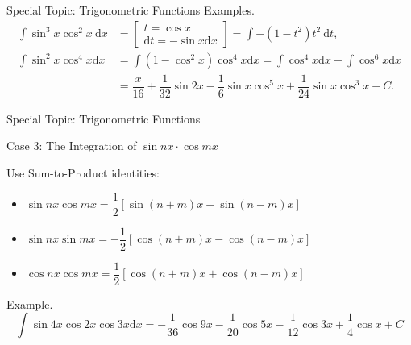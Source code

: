 \documentclass{beamer}
\begin{document}
    \begin{frame}[t]{Special Topic: Trigonometric Functions}
        \textcolor{yy}{Examples.}
        \begin{equation*}
            \begin{aligned}
                \int \sin^3 x\cos^2 x\ \mathrm{d}x &= \left[\begin{array}{c} t = \cos x \\ \mathrm{d}t = -\sin x \mathrm{d}x \end{array}\right] =\int -(1-t^2)t^2\ \mathrm{d}t, \\
                \int \sin ^{2} x \cos ^{4} x \mathrm{d}x & =\int (1-\cos^2 x)\cos ^{4} x \mathrm{d}x=\int \cos^4 x \mathrm{d}x-\int \cos^6 x \mathrm{d}x\\
                & = \dfrac{x}{16}+\dfrac{1}{32} \sin 2 x-\dfrac{1}{6} \sin x \cos ^{5}x+\dfrac{1}{24} \sin x \cos ^{3}x+C.
            \end{aligned}
        \end{equation*}
    \end{frame}

    \begin{frame}[t]{Special Topic: Trigonometric Functions}
        \begin{block}{Case 3: The Integration of $\sin nx \cdot \cos mx$}
            \par Use Sum-to-Product identities:
            \begin{itemize}
                \item $\sin nx\cos mx=\dfrac{1}{2}[\sin(n+m)x+\sin(n-m)x]$
                \item $\sin nx\sin mx={-}\dfrac{1}{2}[\cos(n+m)x-\cos(n-m)x]$
                \item $\cos nx\cos mx=\dfrac{1}{2}[\cos(n+m)x+\cos(n-m)x]$
            \end{itemize}
        \end{block}
        \par \textcolor{yy}{Example.} $$\int \sin 4 x \cos 2 x \cos 3 x \mathrm{d}x = -\dfrac{1}{36} \cos 9 x-\dfrac{1}{20} \cos 5 x-\dfrac{1}{12} \cos 3 x+\dfrac{1}{4} \cos x+C$$
    \end{frame}
\end{document}
